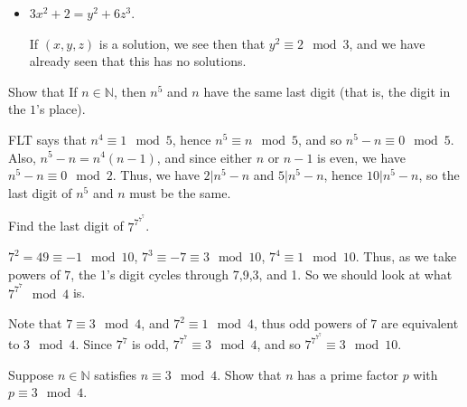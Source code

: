 \documentclass[11pt,dvipsnames]{book}
\numberwithin{equation}{section} %
\numberwithin{figure}{section} %
\numberwithin{table}{section} %
\begin{document}
\begin{exercise}
\begin{exercise}
\begin{itemize}
\item $3x^2+2=y^2+6z^3$.

\begin{solution}
If $(x,y,z)$ is a  solution, we see then that $y^2\equiv 2\mod 3$, and we have already seen that this has no solutions. 

\end{solution}


\end{itemize}

\end{exercise}



\begin{exercise} Show that If $n\in\mathbb{N}$, then $n^5$ and $n$ have the same last digit (that is, the digit in the $1$'s place). 

\begin{solution}
FLT says that $n^{4}\equiv 1 \mod 5$, hence $n^{5}\equiv n \mod 5$, and so $n^{5}-n\equiv 0\mod 5$. Also, $n^5-n=n^4(n-1)$, and since either $n$ or $n-1$ is even, we have $n^5-n\equiv 0\mod 2$. Thus, we have $2|n^5-n$ and $5| n^5-n$, hence $10|n^5-n$, so the last digit of $n^5$ and $n$ must be the same.
\end{solution}

\end{exercise}


\begin{exercise} Find the last digit of $7^{7^{7^{7}}}$.

\begin{solution}
$7^2=49\equiv -1\mod 10$, $7^3\equiv -7\equiv 3\mod 10$, $7^4\equiv 1 \mod 10$. Thus, as we take powers of $7$, the 1's digit cycles through 7,9,3, and 1. So we should look at what $7^{7^7}\mod 4$ is. 

Note that $7\equiv 3\mod 4$, and $7^2\equiv 1\mod 4$, thus odd powers of $7$ are equivalent to $3\mod 4$. Since $7^7$ is odd, $7^{7^7}\equiv 3\mod 4$, and so $7^{7^{7^{7}}}\equiv 3\mod 10$.
\end{solution}



\end{exercise}


\begin{exercise} Suppose $n\in\mathbb{N}$ satisfies $n\equiv 3\mod 4$. Show that $n$ has a prime factor $p$ with $p\equiv 3\mod 4$. 

\begin{solution}


\end{solution}
\end{exercise}
\end{exercise}
\end{document}
